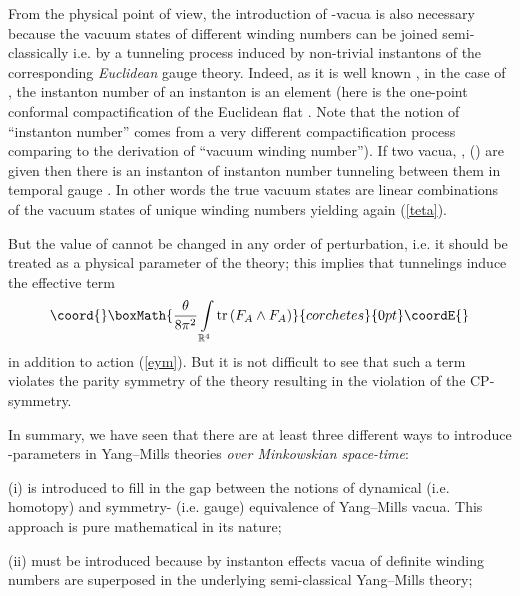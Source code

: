 \documentclass[a4paper,12pt,draft]{article}
\providecommand{\Z}{{\mathbb Z}}
\providecommand{\R}{{\mathbb R}}
\providecommand{\tr}{{\rm tr}}
\begin{document}
From the physical point of view, the introduction of \myHighlight{$\theta$}\coordHE{}-vacua is
also necessary because the vacuum states of different winding numbers can
be joined semi-classically i.e. by a tunneling process induced by
non-trivial instantons of the corresponding {\it Euclidean} gauge theory.
Indeed, as it is well known \cite{che}\cite{kak}, in the case
of \coordHE{}, the instanton number of an instanton is an element \myHighlight{$k\in
H^4(S^4, \Z )\simeq\Z$}\coordHE{} (here \coordHE{} is the one-point conformal
compactification of the Euclidean flat \myHighlight{$\R^4$}\coordHE{}. Note that the notion of 
``instanton number'' comes from a very different
compactification process comparing to the derivation of ``vacuum winding
number''). If two vacua, \coordHE{}, \coordHE{} (\myHighlight{$n_1,
n_2\in \pi_3(SU(2))\simeq\Z$}\coordHE{}) are given then there is an instanton of instanton
number \myHighlight{$n_2-n_1\in H^4(S^4,\Z )\simeq\Z$}\coordHE{} tunneling between them in
temporal gauge \cite{che}\cite{kak}. In other words the true vacuum
states are linear combinations of the vacuum states of unique winding numbers 
yielding again (\ref{teta}). 

But the value of \myHighlight{$\theta$}\coordHE{} cannot be changed in any order of perturbation,
i.e. it should be treated as a physical parameter of the theory; this
implies that tunnelings induce the effective term
\[\coord{}\boxMath{{\theta\over 8\pi^2}\int\limits_{\R^4}\tr\left( F_A\wedge F_A\right)}{corchetes}{0pt}\coordE{}\]
in addition to action (\ref{eym}). But it is not difficult to see that
such a term violates the parity symmetry \coordHE{} of the theory resulting in 
the violation of the CP-symmetry.

In summary, we have seen that there are at least three different ways to
introduce \myHighlight{$\theta$}\coordHE{}-parameters in Yang--Mills theories {\it over
Minkowskian space-time}:

(i) \myHighlight{$\theta$}\coordHE{} is introduced to fill in the gap between the notions of
dynamical (i.e. homotopy) and symmetry- (i.e. gauge)
equivalence of Yang--Mills vacua. This approach is pure mathematical in
its nature;

(ii) \myHighlight{$\theta$}\coordHE{} must be introduced because by instanton effects vacua of
definite winding numbers are superposed in the underlying semi-classical
Yang--Mills theory;
\end{document}

